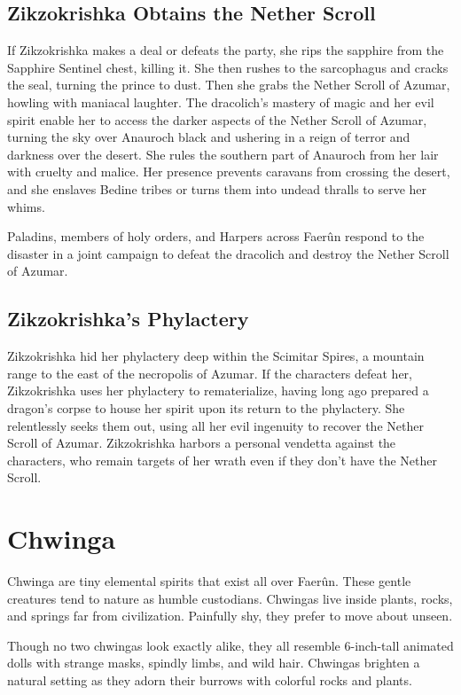 \documentclass[10pt,a4paper,twoside,bg=print,twocolumn,openany,nodeprecatedcode]{dndbook}
\begin{document}
\subsection{Zikzokrishka Obtains the Nether Scroll}
If Zikzokrishka makes a deal or defeats the party, she rips the sapphire from the Sapphire Sentinel chest, killing it. She then rushes to the sarcophagus and cracks the seal, turning the prince to dust. Then she grabs the Nether Scroll of Azumar, howling with maniacal laughter. The dracolich's mastery of magic and her evil spirit enable her to access the darker aspects of the Nether Scroll of Azumar, turning the sky over Anauroch black and ushering in a reign of terror and darkness over the desert. She rules the southern part of Anauroch from her lair with cruelty and malice. Her presence prevents caravans from crossing the desert, and she enslaves Bedine tribes or turns them into undead thralls to serve her whims.

Paladins, members of holy orders, and Harpers across Faerûn respond to the disaster in a joint campaign to defeat the dracolich and destroy the Nether Scroll of Azumar.

\subsection{Zikzokrishka's Phylactery}
Zikzokrishka hid her phylactery deep within the Scimitar Spires, a mountain range to the east of the necropolis of Azumar. If the characters defeat her, Zikzokrishka uses her phylactery to rematerialize, having long ago prepared a dragon's corpse to house her spirit upon its return to the phylactery. She relentlessly seeks them out, using all her evil ingenuity to recover the Nether Scroll of Azumar. Zikzokrishka harbors a personal vendetta against the characters, who remain targets of her wrath even if they don't have the Nether Scroll.

\section{Chwinga}
Chwinga are tiny elemental spirits that exist all over Faerûn. These gentle creatures tend to nature as humble custodians. Chwingas live inside plants, rocks, and springs far from civilization. Painfully shy, they prefer to move about unseen.

Though no two chwingas look exactly alike, they all resemble 6-inch-tall animated dolls with strange masks, spindly limbs, and wild hair. Chwingas brighten a natural setting as they adorn their burrows with colorful rocks and plants.
\end{document}
